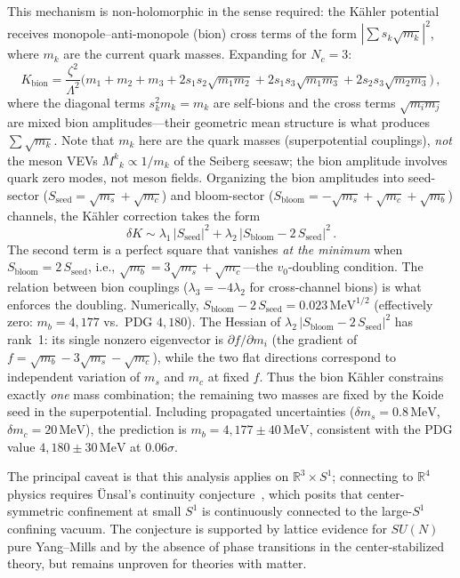 \documentclass[12pt,a4paper]{article}
\newcommand{\MeV}{\,\text{MeV}}
\begin{document}
This mechanism is non-holomorphic in the sense required: the
K\"ahler potential receives monopole--anti-monopole (bion) cross terms
of the form $|\!\sum s_k\sqrt{m_k}|^2$, where $m_k$ are the
current quark masses. Expanding for $N_c = 3$:
\begin{equation*}
  K_{\text{bion}} = \frac{\zeta^2}{\Lambda^2}\bigl(
  m_1 + m_2 + m_3
  + 2s_1 s_2\sqrt{m_1 m_2}
  + 2s_1 s_3\sqrt{m_1 m_3}
  + 2s_2 s_3\sqrt{m_2 m_3}\bigr)\,,
\end{equation*}
where the diagonal terms $s_k^2 m_k = m_k$ are self-bions and the
cross terms $\sqrt{m_i m_j}$ are mixed bion amplitudes---their
geometric mean structure is what produces $\sum\sqrt{m_k}$.
Note that $m_k$ here are the quark masses (superpotential couplings),
\emph{not} the meson VEVs $M^k{}_k \propto 1/m_k$ of the Seiberg
seesaw; the bion amplitude involves quark zero modes, not meson fields.
Organizing the bion amplitudes into
seed-sector ($S_{\text{seed}} = \sqrt{m_s} + \sqrt{m_c}$) and
bloom-sector ($S_{\text{bloom}} = -\!\sqrt{m_s} + \sqrt{m_c} + \sqrt{m_b}$)
channels, the K\"ahler correction takes the form
\begin{equation*}
  \delta K \sim \lambda_1\,|S_{\text{seed}}|^2
  + \lambda_2\,|S_{\text{bloom}} - 2\,S_{\text{seed}}|^2\,.
\end{equation*}
The second term is a perfect square that vanishes
\emph{at the minimum} when $S_{\text{bloom}} = 2\,S_{\text{seed}}$,
i.e., $\sqrt{m_b} = 3\sqrt{m_s} + \sqrt{m_c}$---the
$v_0$-doubling condition. The relation between bion couplings
($\lambda_3 = -4\lambda_2$ for cross-channel bions) is what
enforces the doubling. Numerically,
$S_{\text{bloom}} - 2\,S_{\text{seed}} = 0.023\MeV^{1/2}$
(effectively zero: $m_b = 4{,}177$ vs.\ PDG $4{,}180$).
The Hessian of $\lambda_2\,|S_{\text{bloom}} - 2\,S_{\text{seed}}|^2$
has rank~1: its single nonzero eigenvector is
$\partial f/\partial m_i$ (the gradient of
$f = \sqrt{m_b} - 3\sqrt{m_s} - \sqrt{m_c}$), while the two flat
directions correspond to independent variation of $m_s$ and $m_c$
at fixed $f$.  Thus the bion K\"ahler constrains exactly \emph{one}
mass combination; the remaining two masses are fixed by the Koide
seed in the superpotential. Including propagated uncertainties
($\delta m_s = 0.8\MeV$, $\delta m_c = 20\MeV$), the prediction
is $m_b = 4{,}177 \pm 40\MeV$, consistent with the PDG value
$4{,}180 \pm 30\MeV$ at $0.06\sigma$.

The principal caveat is that this analysis
applies on $\mathbb{R}^3 \times S^1$; connecting to $\mathbb{R}^4$
physics requires \"Unsal's continuity conjecture~\cite{Unsal2012},
which posits that center-symmetric confinement at small $S^1$ is
continuously connected to the large-$S^1$ confining vacuum.
The conjecture is supported by lattice evidence for $SU(N)$ pure
Yang--Mills and by the absence of phase transitions in the
center-stabilized theory, but remains unproven for theories with
matter.
\end{document}
